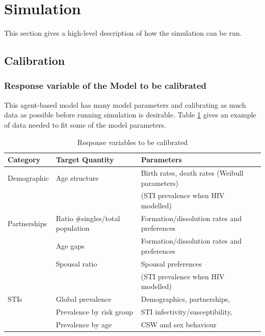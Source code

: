 \documentclass[11pt, onecolumn]{article}
\begin{document}

\section{Simulation}

This section gives a high-level description of how the simulation can be run. 

\subsection{Calibration}

\subsubsection{Response variable of the Model to be calibrated}

This agent-based model has many model parameters and calibrating as much data as possible before running simulation is desirable. Table \ref{tab:calibration} gives an example of data needed to fit some of the model parameters.

\begin{table}[htdp]
\caption{Response variables to be calibrated}
\begin{center}
\begin{tabular}{lll}

\hline
\textbf{Category} & \textbf{Target Quantity} & \textbf{Parameters} \\

\hline
Demographic  &  Age structure & Birth rates, death rates (Weibull parameters)\\
 & & (STI prevalence when HIV modelled)\\
\hline
Partnerships  &  Ratio \#singles/total population  &  Formation/dissolution rates and preferences \\
  &  Age gaps &   Formation/dissolution rates and preferences  \\
  &  Spousal ratio & Spousal preferences \\
 & & (STI prevalence when HIV modelled)\\
\hline
STIs	& Global prevalence & Demographics, partnerships,\\
	& Prevalence by risk group & STI infectivity/susceptibility,\\
	& Prevalence by age & CSW and sex behaviour\\
\hline
\end{tabular}
\end{center}
\label{tab:calibration}
\end{table}
\end{document}
